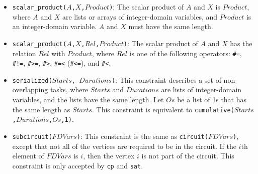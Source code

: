 \begin{itemize}
\item \texttt{scalar\_product($A$,$X$,$Product$)}: The scalar product of $A$ and $X$ is $Product$, where $A$ and $X$ are lists or arrays of integer-domain variables, and $Product$ is an integer-domain variable. $A$ and $X$ must have the same length.

\item \texttt{scalar\_product($A$,$X$,$Rel$,$Product$)}: The scalar product of $A$ and $X$ has the relation $Rel$ with $Product$, where $Rel$ is one of the following operators: \verb+#=+, \verb+#!=+, \verb+#>=+, \verb+#>+, \verb+#=<+ (\verb+#<=+), and \verb+#<+. 

\item \texttt{serialized($Starts$, $Durations$)}: This constraint describes a set of non-overlapping tasks, where $Starts$ and $Durations$ are lists of integer-domain variables, and the lists have the same length. Let $Os$ be a list of 1s that has the same length as $Starts$. This constraint is equivalent to \texttt{cumulative($Starts$,$Durations$,$Os$,1)}.

\item \texttt{subcircuit($FDVars$)}: This constraint is the same as \texttt{circuit($FDVars$)}, except that not all of the vertices are required to be in the circuit. If the $i$th element of $FDVars$ is $i$, then the vertex $i$ is not part of the circuit. This constraint is only accepted by \texttt{cp} and {\tt sat}.

\end{itemize}

